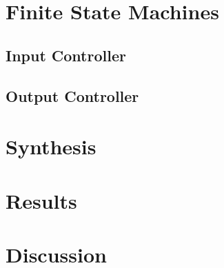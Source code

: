 \documentclass[11pt,a4paper]{article}
\begin{document}
\section{Finite State Machines}
\subsection{Input Controller}

\subsection{Output Controller}


\section{Synthesis}

\section{Results}

\section{Discussion}
\end{document}
